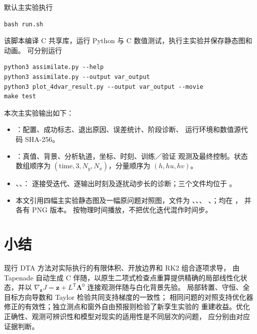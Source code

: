 \documentclass[12pt,a4paper]{article}
\newcommand{\LL}{\bm{\Lambda}}
\newcommand{\trans}{^{\mathsf T}}
\begin{document}
默认主实验执行
\begin{verbatim}
bash run.sh
\end{verbatim}
该脚本编译 C 共享库，运行 Python 与 C 数值测试，执行主实验并保存静态图和动画。
可分别运行
\begin{verbatim}
python3 assimilate.py --help
python3 assimilate.py --output var_output
python3 plot_4dvar_result.py --output var_output --movie
make test
\end{verbatim}
本次主实验输出如下：
\begin{itemize}
 \item {}：配置、成功标志、退出原因、误差统计、阶段诊断、
       运行环境和数值源代码 SHA-256。
 \item {}：真值、背景、分析轨道，坐标、时刻、训练／验证
       观测及最终控制。状态数组顺序为 $(\text{time},3,N_y,N_x)$，分量顺序为 $(h,hu,hv)$。
 \item {}、、：
       逐接受迭代、逐输出时刻及逐扰动步长的诊断；三个文件均位于 。
 \item 本文引用四幅主实验静态图及一幅原问题对照图，文件为
       、、、
       、；均在 ，
       并各有 PNG 版本。 按物理时间播放，不把优化迭代混作时间步。
\end{itemize}

\section{小结}

现行 DTA 方法对实际执行的有限体积、开放边界和 RK2 组合逐项求导，
由 Tapenade 自动生成 C 伴随，以原生二项式检查点重算提供精确的局部线性化状态，并以
$\nabla_{\mathbf z}J=\mathbf z+L\trans\LL^0$ 连接观测伴随与白化背景先验。
局部转置、守恒、全目标方向导数和 Taylor 检验共同支持梯度的一致性；
相同问题的对照支持优化器修正的有效性；独立测点和窗外自由预报则检验了新孪生实验的
重建收益。优化正确性、观测可辨识性和模型对现实的适用性是不同层次的问题，
应分别由对应证据判断。



\end{document}

